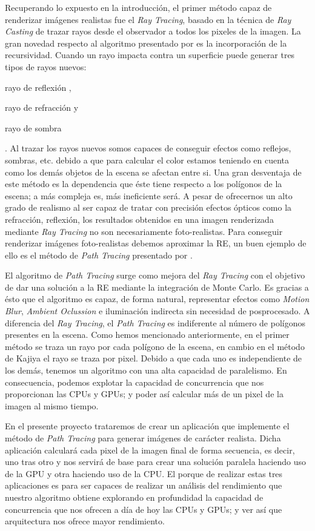 \documentclass[titlepage,12pt]{report}
\begin{document}
Recuperando lo expuesto en la introducción, el primer método capaz de renderizar imágenes realistas fue el \textit{Ray Tracing}, basado en la técnica de \textit{Ray Casting} de trazar rayos desde el observador a todos los pixeles de la imagen. La gran novedad respecto al algoritmo presentado por \citep{Appel1968} es la incorporación de la recursividad. Cuando un rayo impacta contra un superficie puede generar tres tipos de rayos nuevos: \begin{enumerate*}[label=\roman*)] \item rayo de reflexión \label{ray:reflected}, \item rayo de refracción y \item rayo de sombra \end{enumerate*}. Al trazar los rayos nuevos somos capaces de conseguir efectos como reflejos, sombras, etc. debido a que para calcular el color estamos teniendo en cuenta como los demás objetos de la escena se afectan entre si. Una gran desventaja de este método es la dependencia que éste tiene respecto a los polígonos de la escena; a más compleja es, más ineficiente será. A pesar de ofrecernos un alto grado de realismo al ser capaz de tratar con precisión efectos ópticos como la refracción, reflexión, los resultados obtenidos en una imagen renderizada mediante \textit{Ray Tracing} no son necesariamente foto-realistas. Para conseguir renderizar imágenes foto-realistas debemos aproximar la RE, un buen ejemplo de ello es el método de \textit{Path Tracing} presentado por \citep{Kajiya1986}.

El algoritmo de \textit{Path Tracing} surge como mejora del \textit{Ray Tracing} con el objetivo de dar una solución a la RE mediante la integración de Monte Carlo. Es gracias a ésto que el algoritmo es capaz, de forma natural, representar efectos como \textit{Motion Blur}, \textit{Ambient Oclussion} e iluminación indirecta sin necesidad de posprocesado. A diferencia del \textit{Ray Tracing}, el \textit{Path Tracing} es indiferente al número de polígonos presentes en la escena. Como hemos mencionado anteriormente, en el primer método se traza un rayo por cada polígono de la escena, en cambio en el método de Kajiya el rayo se traza por pixel. Debido a que cada uno es independiente de los demás, tenemos un algoritmo con una alta capacidad de paralelismo. En consecuencia, podemos explotar la capacidad de concurrencia que nos proporcionan las CPUs y GPUs; y poder así calcular más de un pixel de la imagen al mismo tiempo.

En el presente proyecto trataremos de crear un aplicación que implemente el método de \textit{Path Tracing} para generar imágenes de carácter realista. Dicha aplicación calculará cada pixel de la imagen final de forma secuencia, es decir, uno tras otro y nos servirá de base para crear una solución paralela haciendo uso de la GPU y otra haciendo uso de la CPU. El porque de realizar estas tres aplicaciones es para ser capaces de realizar un análisis del rendimiento que nuestro algoritmo obtiene explorando en profundidad la capacidad de concurrencia que nos ofrecen a día de hoy las CPUs y GPUs; y ver así que arquitectura nos ofrece mayor rendimiento.
\end{document}
